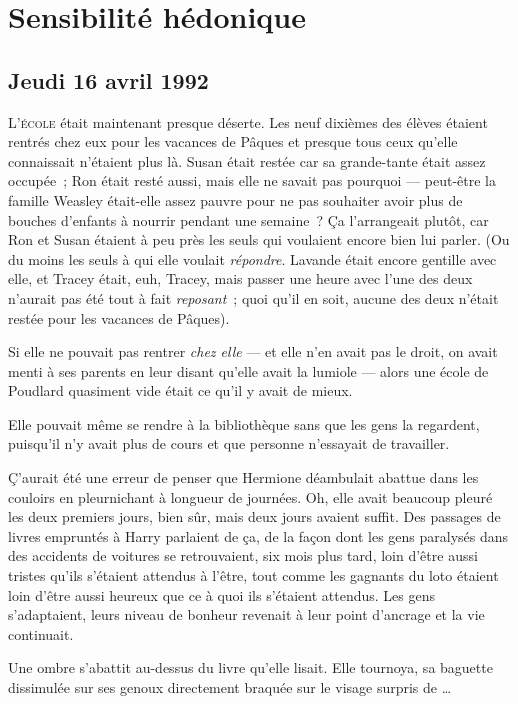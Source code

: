 \chapter{Sensibilité hédonique}

\section{Jeudi 16 avril 1992}

\lettrine{L}{'école}  était maintenant presque déserte. Les neuf dixièmes des élèves étaient rentrés chez eux pour les vacances de Pâques et presque tous ceux qu'elle connaissait n'étaient plus là. Susan était restée car sa grande-tante était assez occupée~; Ron était resté aussi, mais elle ne savait pas pourquoi — peut-être la famille Weasley était-elle assez pauvre pour ne pas souhaiter avoir plus de bouches d'enfants à nourrir pendant une semaine~? Ça l'arrangeait plutôt, car Ron et Susan étaient à peu près les seuls qui voulaient encore bien lui parler. (Ou du moins les seuls à qui elle voulait \emph{répondre}. Lavande était encore gentille avec elle, et Tracey était, euh, Tracey, mais passer une heure avec l'une des deux n'aurait pas été tout à fait \emph{reposant}~; quoi qu'il en soit, aucune des deux n'était restée pour les vacances de Pâques).

Si elle ne pouvait pas rentrer \emph{chez elle} — et elle n'en avait pas le droit, on avait menti à ses parents en leur disant qu'elle avait la lumiole — alors une école de Poudlard quasiment vide était ce qu'il y avait de mieux.

Elle pouvait même se rendre à la bibliothèque sans que les gens la regardent, puisqu'il n'y avait plus de cours et que personne n'essayait de travailler.

Ç'aurait été une erreur de penser que Hermione déambulait abattue dans les couloirs en pleurnichant à longueur de journées. Oh, elle avait beaucoup pleuré les deux premiers jours, bien sûr, mais deux jours avaient suffit. Des passages de livres empruntés à Harry parlaient de ça, de la façon dont les gens paralysés dans des accidents de voitures se retrouvaient, six mois plus tard, loin d'être aussi tristes qu'ils s'étaient attendus à l'être, tout comme les gagnants du loto étaient loin d'être aussi heureux que ce à quoi ils s'étaient attendus. Les gens s'adaptaient, leurs niveau de bonheur revenait à leur point d'ancrage et la vie continuait.

Une ombre s'abattit au-dessus du livre qu'elle lisait. Elle tournoya, sa baguette dissimulée sur ses genoux directement braquée sur le visage surpris de …

